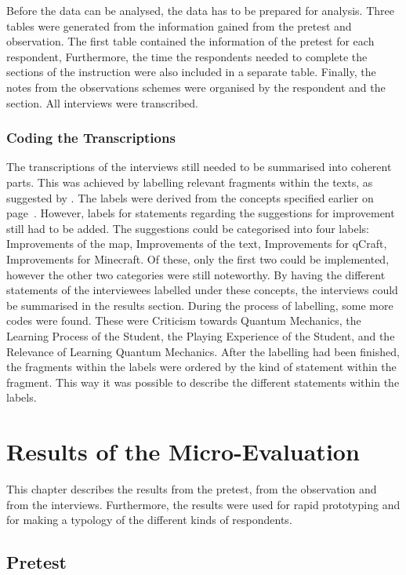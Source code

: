 \documentclass[11pt,twoside]{report} %
\begin{document}
Before the data can be analysed, the data has to be prepared for analysis. Three tables were generated from the information gained from the pretest and observation. The first table contained the information of the pretest for each respondent, Furthermore, the time the respondents needed to complete the sections of the instruction were also included in a separate table. Finally, the notes from the observations schemes were organised by the respondent and the section. All interviews were transcribed.

\subsection{Coding the Transcriptions}

The transcriptions of the interviews still needed to be summarised into coherent parts. This was achieved by labelling relevant fragments within the texts, as suggested by . The labels were derived from the concepts specified earlier on page~\pageref{subsec:evaconcepts}. However, labels for statements regarding the suggestions for improvement still had to be added. The suggestions could be categorised into four labels: Improvements of the map, Improvements of the text, Improvements for qCraft, Improvements for Minecraft. Of these, only the first two could be implemented, however the other two categories were still noteworthy. By having the different statements of the interviewees labelled under these concepts, the interviews could be summarised in the results section. During the process of labelling, some more codes were found. These were Criticism towards Quantum Mechanics, the Learning Process of the Student, the Playing Experience of the Student, and the Relevance of Learning Quantum Mechanics. After the labelling had been finished, the fragments within the labels were ordered by the kind of statement within the fragment. This way it was possible to describe the different statements within the labels.

\chapter{Results of the Micro-Evaluation}

This chapter describes the results from the pretest, from the observation and from the interviews. Furthermore, the results were used for rapid prototyping and for making a typology of the different kinds of respondents.

\section{Pretest}
\end{document}
